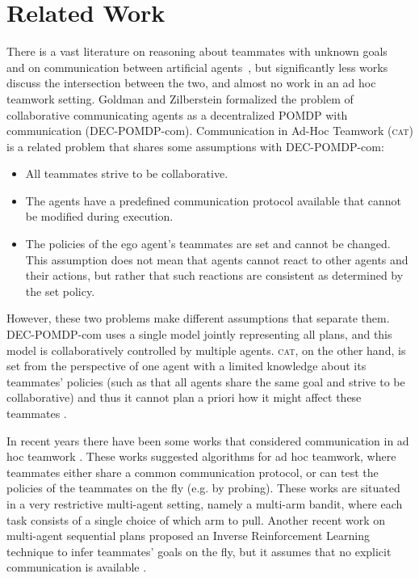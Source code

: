 \documentclass[letterpaper]{article}
\begin{document}
\section{Related Work}
There is a vast literature on reasoning about teammates with unknown goals~\cite{fern2007decision,albrecht2018autonomous} and on communication between artificial agents~\cite{cohen1997team,decker1987distributed,pynadath2002communicative}, but significantly less works discuss the intersection between the two, and almost no work in an ad hoc teamwork setting.
Goldman and Zilberstein  formalized the problem of collaborative communicating agents as a decentralized POMDP with communication (DEC-POMDP-com).
Communication in Ad-Hoc Teamwork (\textsc{cat}) is a related problem that shares some assumptions with DEC-POMDP-com:
\begin{itemize}
    \item All teammates strive to be collaborative.
    \item The agents have a predefined communication protocol available that cannot be modified during execution.
    \item The policies of the ego agent's teammates are set and cannot be changed.  This assumption does not mean that agents cannot react to other agents and their actions, but rather that such reactions are consistent as determined by the set policy.
\end{itemize}
However, these two problems make different assumptions that separate them. DEC-POMDP-com uses a single model jointly representing all plans, and this model is collaboratively controlled by multiple agents. \textsc{cat}, on the other hand, is set from the perspective of one agent with a limited knowledge about its teammates' policies (such as that all agents share the same goal and strive to be collaborative) and thus it cannot plan a priori how it might affect these teammates \cite{stone2013teaching,ravula2019ad}.

In recent years there have been some works that considered communication in ad hoc teamwork \cite{barrett2014communicating,chakraborty2017coordinated}.
These works suggested algorithms for ad hoc teamwork, where teammates either share a common communication protocol, or can test the policies of the teammates on the fly (e.g. by probing).
These works are situated in a very restrictive multi-agent setting, namely a multi-arm bandit, where each task consists of a single choice of which arm to pull. Another recent work on multi-agent sequential plans proposed an Inverse Reinforcement Learning technique to infer teammates' goals on the fly, but it assumes that no explicit communication is available \cite{wang2020too}.
\end{document}
